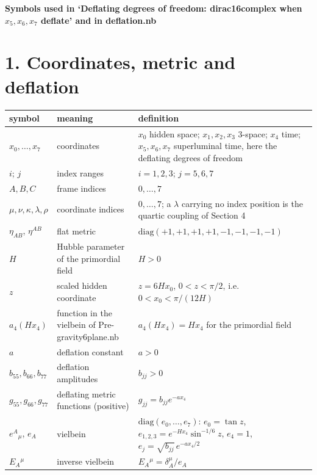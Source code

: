 \documentclass[10pt]{article}
\begin{document}
{\raggedright\LARGE\bfseries Symbols used in `Deflating degrees of freedom: dirac16complex when $x_5, x_6, x_7$ deflate' and in deflation.nb\par}\medskip

\section*{1. Coordinates, metric and deflation}

{\small\begin{longtable}{>{\raggedright\arraybackslash}p{}>{\raggedright\arraybackslash}p{}>{\raggedright\arraybackslash}p{}}\toprule
symbol & meaning & definition \\\midrule\endhead
\bottomrule\endfoot
$x_0, \dots, x_7$ & coordinates & $x_0$ hidden space; $x_1, x_2, x_3$ 3-space; $x_4$ time; $x_5, x_6, x_7$ superluminal time, here the deflating degrees of freedom \\
$i$; $j$ & index ranges & $i = 1, 2, 3$; $j = 5, 6, 7$ \\
$A, B, C$ & frame indices & $0, \dots, 7$ \\
$\mu, \nu, \kappa, \lambda, \rho$ & coordinate indices & $0, \dots, 7$; a $\lambda$ carrying no index position is the quartic coupling of Section 4 \\
$\eta_{AB}$, $\eta^{AB}$ & flat metric & $\mathrm{diag}(+1,+1,+1,+1,-1,-1,-1,-1)$ \\
$H$ & Hubble parameter of the primordial field & $H > 0$ \\
$z$ & scaled hidden coordinate & $z = 6Hx_0$, $0 < z < \pi/2$, i.e. $0 < x_0 < \pi/(12H)$ \\
$a_4(Hx_4)$ & function in the vielbein of Pre-gravity6plane.nb & $a_4(Hx_4) = Hx_4$ for the primordial field \\
$a$ & deflation constant & $a > 0$ \\
$b_{55}, b_{66}, b_{77}$ & deflation amplitudes & $b_{jj} > 0$ \\
$g_{55}, g_{66}, g_{77}$ & deflating metric functions (positive) & $g_{jj} = b_{jj}e^{-ax_4}$ \\
$e^A{}_\mu$, $e_A$ & vielbein & $\mathrm{diag}(e_0, \dots, e_7)$: $e_0 = \tan z$, $e_{1,2,3} = e^{-Hx_4}\sin^{-1/6}z$, $e_4 = 1$, $e_j = \sqrt{b_{jj}}\,e^{-ax_4/2}$ \\
$E_A{}^\mu$ & inverse vielbein & $E_A{}^\mu = \delta_A^\mu/e_A$ \\

\end{longtable}}
\end{document}
